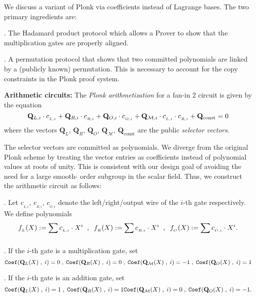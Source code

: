 \documentclass[11pt, lettersize, notitlepage, leqno, footskip=0.6cm]{article}
\newcommand{\mc}{\mathcal}
\newcommand{\mbf}{\mathbf}
\newcommand{\mr}{\mathrm}
\newcommand{\vs}{\vspace{-0.15cm}}
\newcommand{\noin}{\noindent}
\numberwithin{equation}{section}
\begin{document}
We discuss a variant of Plonk via coefficients instead of Lagrange bases. The two primary ingredients are: \vspace{2mm}

\noin 1. The Hadamard product protocol which allows a Prover to show that the multiplication gates are properly aligned. \vspace{1mm}

\noin 2. A permutation protocol that shows that two committed polynomials are linked by a (publicly known) permutation. This is necessary to account for the copy constraints in the Plonk proof system. \bigskip

\noin \textbf{Arithmetic circuits:} The \textit{Plonk arithmetization} for a fan-in 2 circuit is given by the equation \vs $$ \mbf{Q}_{L,i}\cdot c_{_{L,i}} + \mbf{Q}_{R,i}\cdot c_{_{R,i}} + \mbf{Q}_{O,i}\cdot c_{_{O,i}} +  \mbf{Q}_{\mc{M},i}\cdot c_{_{L,i}}\cdot c_{_{R,i}} + \mbf{Q}_{\mr{const}} = 0 \vs $$ where the vectors $\mbf{Q}_{L}$, $\mbf{Q}_{R}$, $\mbf{Q}_{O}$, $\mbf{Q}_{\mc{M}}$, $\mbf{Q}_{\mr{const}}$ are the public \textit{selector vectors}. \vspace{1.5mm}

The selector vectors are committed as polynomials. We diverge from the original Plonk scheme by treating the vector entries as coefficients instead of polynomial values at roots of unity. This is consistent with our design goal of avoiding the need for a large smooth- order subgroup in the scalar field. Thus, we construct the arithmetic circuit as follows: \vspace{2mm}

\noin 1. Let $c_{_{L,i}}$, $c_{_{R,i}}$, $c_{_{O,i}}$ denote the left/right/output wire of the $i$-th gate respectively. We define polynomials \vs $$ f_{_L}(X):= \sum\limits_{} c_{_{L,i}}\cdot X^i\;\;,\;\;f_{_R}(X):= \sum\limits_{} c_{_{R,i}}\cdot X^i\;\;,\;\;f_{_O}(X):= \sum\limits_{} c_{_{O,i}}\cdot X^i.  \vs  $$

\noin 2. If the $i$-th gate is a multiplication gate, set \vs $${\tt{Coef}}(\mbf{Q}_{L}(X)\;,\;i) = 0\;,\;{\tt{Coef}}(\mbf{Q}_{R}(X)\;,\;i) = 0 \;,\; {\tt{Coef}}(\mbf{Q}_{\mc{M}}(X)\;,\;i) = -1\;,\;{\tt{Coef}}(\mbf{Q}_{O}(X)\;,\;i) = 1  $$



\noin 3. If the $i$-th gate is an addition gate, set  \vs $${\tt{Coef}}(\mbf{Q}_{L}(X)\;,\;i) = 1\;,\;{\tt{Coef}}(\mbf{Q}_{R}(X)\;,\;i) = 1 {\tt{Coef}}(\mbf{Q}_{\mc{M}}(X)\;,\;i) = 0\;,\;{\tt{Coef}}(\mbf{Q}_{O}(X)\;,\;i) = -1.  $$
\end{document}
